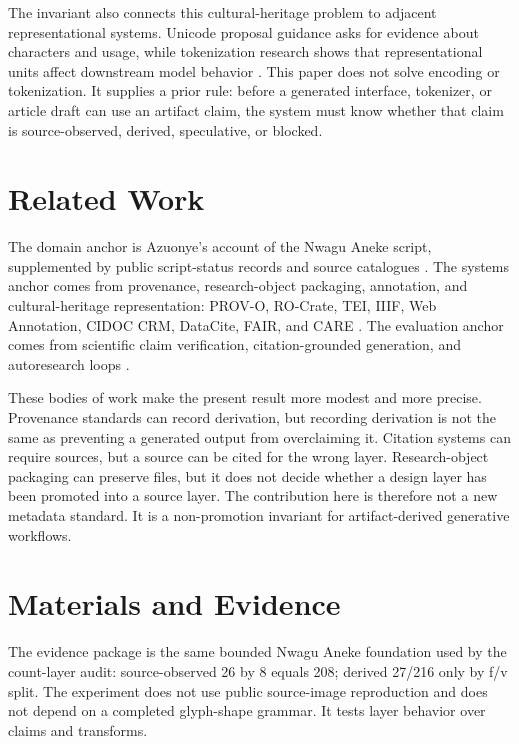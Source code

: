 \documentclass[sigconf,nonacm]{acmart}
\begin{document}
The invariant also connects this cultural-heritage problem to adjacent
representational systems. Unicode proposal guidance asks for evidence about
characters and usage, while tokenization research shows that representational
units affect downstream model behavior
\cite{seiProposalTips,sennrich2016bpe,kudo2018sentencepiece,bostrom2020bytepair,rust2021tokenization}.
This paper does not solve encoding or tokenization. It supplies a prior rule:
before a generated interface, tokenizer, or article draft can use an artifact
claim, the system must know whether that claim is source-observed, derived,
speculative, or blocked.

\section{Related Work}
The domain anchor is Azuonye's account of the Nwagu Aneke script, supplemented
by public script-status records and source catalogues \cite{azuonye1992,omniglotNwagu,unicodeAfricanScripts2023,scriptSourceNwagu,sirisNwaguProposal}.
The systems anchor comes from provenance, research-object packaging, annotation,
and cultural-heritage representation: PROV-O, RO-Crate, TEI, IIIF, Web
Annotation, CIDOC CRM, DataCite, FAIR, and CARE \cite{w3cProvO,rocrate12,teiP5Glyphs,iiifPresentation3,w3cAnnotationModel,w3cAnnotationVocab,cidocCrm,datacite45,wilkinson2016fair,carroll2020care}.
The evaluation anchor comes from scientific claim verification, citation-grounded
generation, and autoresearch loops \cite{wadden2020scifact,gao2023alce,karpathyAutoresearch}.

These bodies of work make the present result more modest and more precise.
Provenance standards can record derivation, but recording derivation is not the
same as preventing a generated output from overclaiming it. Citation systems can
require sources, but a source can be cited for the wrong layer. Research-object
packaging can preserve files, but it does not decide whether a design layer has
been promoted into a source layer. The contribution here is therefore not a new
metadata standard. It is a non-promotion invariant for artifact-derived
generative workflows.

\section{Materials and Evidence}
The evidence package is the same bounded Nwagu Aneke foundation used by the
count-layer audit: source-observed 26 by 8 equals 208; derived 27/216 only by
f/v split. The experiment does not use public source-image reproduction and does
not depend on a completed glyph-shape grammar. It tests layer behavior over
claims and transforms.
\end{document}

